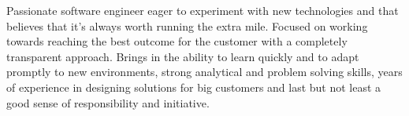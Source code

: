 

\begin{cvparagraph}

Passionate software engineer eager to experiment with new technologies and
that believes that it's always worth running the extra mile. Focused on working
towards reaching the best outcome for the customer with a completely
transparent approach. Brings in the ability to learn quickly and to adapt
promptly to new environments, strong analytical and problem solving skills,
years of experience in designing solutions for big customers and last but not
least a good sense of responsibility and initiative.
\end{cvparagraph}
